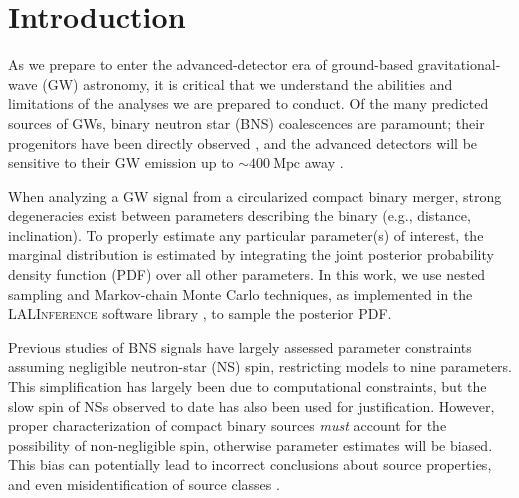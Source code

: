 \section{Introduction}

As we prepare to enter the advanced-detector era of ground-based gravitational-wave (GW) astronomy, it is critical that we understand the abilities and limitations of the analyses we are prepared to conduct. Of the many predicted sources of GWs, binary neutron star (BNS) coalescences are paramount; their progenitors have been directly observed \cite{Lorimer_2008}, and the advanced detectors will be sensitive to their GW emission up to $\sim 400~\mathrm{Mpc}$ away \citep{2013arXiv1304.0670L}.

When analyzing a GW signal from a circularized compact binary merger, strong degeneracies exist between parameters describing the binary (e.g., distance, inclination). To properly estimate any particular parameter(s) of interest, the marginal distribution is estimated by integrating the joint posterior probability density function (PDF) over all other parameters. In this work, we use nested sampling \citep{Veitch_2010} and Markov-chain Monte Carlo \citep{Christensen_2003,R_ver_2006,van_der_Sluys_2008} techniques, as implemented in the \textsc{LALInference} software library \cite{Veitch_2015}, to sample the posterior PDF.

Previous studies of BNS signals have largely assessed parameter constraints assuming negligible neutron-star (NS) spin, restricting models to nine parameters. This simplification has largely been due to computational constraints, but the slow spin of NSs observed to date \citep[e.g.,][]{Mandel_2010} has also been used for justification. However, proper characterization of compact binary sources \emph{must} account for the possibility of non-negligible spin, otherwise parameter estimates will be biased.  This bias can potentially lead to incorrect conclusions about source properties, and even misidentification of source classes \citep{Buonanno_2009,Berry_2014}.


